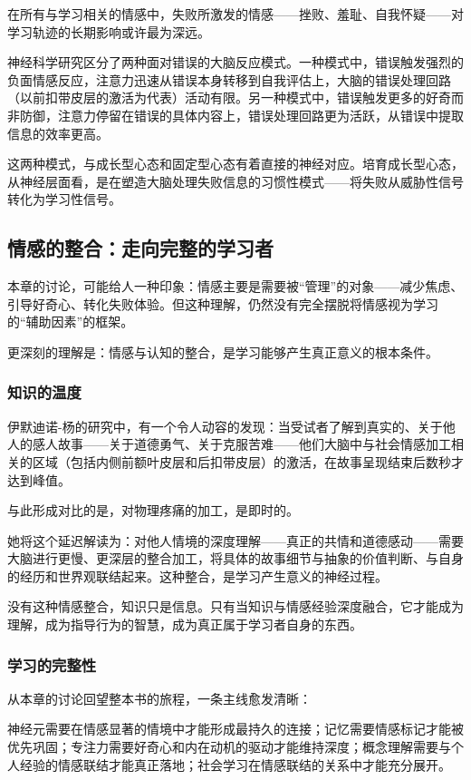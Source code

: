 \documentclass[11pt]{article}
\begin{document}
在所有与学习相关的情感中，失败所激发的情感——挫败、羞耻、自我怀疑——对学习轨迹的长期影响或许最为深远。

神经科学研究区分了两种面对错误的大脑反应模式。一种模式中，错误触发强烈的负面情感反应，注意力迅速从错误本身转移到自我评估上，大脑的错误处理回路（以前扣带皮层的激活为代表）活动有限。另一种模式中，错误触发更多的好奇而非防御，注意力停留在错误的具体内容上，错误处理回路更为活跃，从错误中提取信息的效率更高。

这两种模式，与成长型心态和固定型心态有着直接的神经对应。培育成长型心态，从神经层面看，是在塑造大脑处理失败信息的习惯性模式——将失败从威胁性信号转化为学习性信号。
\subsection{情感的整合：走向完整的学习者}
\label{sec:org7c72af7}

本章的讨论，可能给人一种印象：情感主要是需要被“管理”的对象——减少焦虑、引导好奇心、转化失败体验。但这种理解，仍然没有完全摆脱将情感视为学习的“辅助因素”的框架。

更深刻的理解是：情感与认知的整合，是学习能够产生真正意义的根本条件。
\subsubsection{知识的温度}
\label{sec:orga478097}

伊默迪诺-杨的研究中，有一个令人动容的发现：当受试者了解到真实的、关于他人的感人故事——关于道德勇气、关于克服苦难——他们大脑中与社会情感加工相关的区域（包括内侧前额叶皮层和后扣带皮层）的激活，在故事呈现结束后数秒才达到峰值。

与此形成对比的是，对物理疼痛的加工，是即时的。

她将这个延迟解读为：对他人情境的深度理解——真正的共情和道德感动——需要大脑进行更慢、更深层的整合加工，将具体的故事细节与抽象的价值判断、与自身的经历和世界观联结起来。这种整合，是学习产生意义的神经过程。

没有这种情感整合，知识只是信息。只有当知识与情感经验深度融合，它才能成为理解，成为指导行为的智慧，成为真正属于学习者自身的东西。
\subsubsection{学习的完整性}
\label{sec:org5d75ca6}

从本章的讨论回望整本书的旅程，一条主线愈发清晰：

神经元需要在情感显著的情境中才能形成最持久的连接；记忆需要情感标记才能被优先巩固；专注力需要好奇心和内在动机的驱动才能维持深度；概念理解需要与个人经验的情感联结才能真正落地；社会学习在情感联结的关系中才能充分展开。
\end{document}
